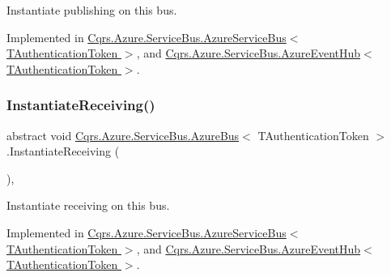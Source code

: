 Instantiate publishing on this bus. 



Implemented in \hyperlink{classCqrs_1_1Azure_1_1ServiceBus_1_1AzureServiceBus_a5c286d29b0bbfe3770f3407efda57036_a5c286d29b0bbfe3770f3407efda57036}{Cqrs.\+Azure.\+Service\+Bus.\+Azure\+Service\+Bus$<$ T\+Authentication\+Token $>$}, and \hyperlink{classCqrs_1_1Azure_1_1ServiceBus_1_1AzureEventHub_a3747fb9fcb3de2a72c8a6d7bbd92db95_a3747fb9fcb3de2a72c8a6d7bbd92db95}{Cqrs.\+Azure.\+Service\+Bus.\+Azure\+Event\+Hub$<$ T\+Authentication\+Token $>$}.

\mbox{\label{classCqrs_1_1Azure_1_1ServiceBus_1_1AzureBus_ac9f66dd531dcde49be72ba8f2cb28e9b_ac9f66dd531dcde49be72ba8f2cb28e9b}} 
\subsubsection{\texorpdfstring{Instantiate\+Receiving()}{InstantiateReceiving()}}
{\footnotesize\ttfamily abstract void \hyperlink{classCqrs_1_1Azure_1_1ServiceBus_1_1AzureBus}{Cqrs.\+Azure.\+Service\+Bus.\+Azure\+Bus}$<$ T\+Authentication\+Token $>$.Instantiate\+Receiving (\begin{DoxyParamCaption}{ }\end{DoxyParamCaption})\hspace{0.3cm}{\ttfamily [protected]}, {}}



Instantiate receiving on this bus. 



Implemented in \hyperlink{classCqrs_1_1Azure_1_1ServiceBus_1_1AzureServiceBus_ad49a2d063279ec98443e7f1d69178cfa_ad49a2d063279ec98443e7f1d69178cfa}{Cqrs.\+Azure.\+Service\+Bus.\+Azure\+Service\+Bus$<$ T\+Authentication\+Token $>$}, and \hyperlink{classCqrs_1_1Azure_1_1ServiceBus_1_1AzureEventHub_aa725781eddb65bdfe456a4fecb36fb6b_aa725781eddb65bdfe456a4fecb36fb6b}{Cqrs.\+Azure.\+Service\+Bus.\+Azure\+Event\+Hub$<$ T\+Authentication\+Token $>$}.

\mbox{\label{classCqrs_1_1Azure_1_1ServiceBus_1_1AzureBus_a8a1be9145b0a92c0037ef1b8b4cc79d9_a8a1be9145b0a92c0037ef1b8b4cc79d9}} 
